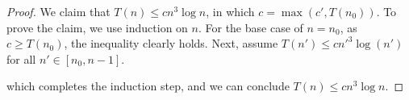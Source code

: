 \documentclass[letterpaper,11pt]{article}
\begin{document}
\begin{proof}
We claim that $T(n) \leq cn^3 \log n$, in which $c=\max(c', T(n_0))$. To prove the claim, we use induction on $n$. For the base case of $n=n_0$, as $c\geq T(n_0)$, the inequality clearly holds.
Next, assume $T(n') \leq cn'^3 \log (n')$ for all $ n' \in [n_0,n-1]$. 

which completes the induction step, and we can conclude $T(n)\leq c n^3\log n$.
\end{proof}
\end{document}
